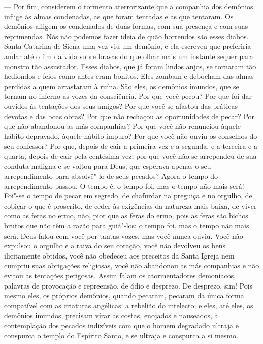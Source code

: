  --- Por fim, considerem o tormento aterrorizante que a companhia dos
demônios inflige às almas condenadas, as que foram tentadas e as que
tentaram. Os demônios afligem os condenados de duas formas, com sua
presença e com suas reprimendas. Nós não podemos fazer ideia de quão
horrendos são esses diabos. Santa Catarina de Siena uma vez viu um
demônio, e ela escreveu que preferiria andar até o fim da vida sobre
brasas do que olhar mais um instante sequer para monstro tão
assustador. Esses diabos, que já foram lindos anjos, se tornaram tão
hediondos e feios como antes eram bonitos. Eles zombam e debocham das
almas perdidas a quem arrastaram à ruína. São eles, os demônios
imundos, que se tornam no inferno as vozes da consciência. Por que você
pecou? Por que foi dar ouvidos às tentações dos seus amigos? Por que
você se afastou das práticas devotas e das boas obras? Por que não
rechaçou as oportunidades de pecar? Por que não abandonou as más
companhias? Por que você não renunciou àquele hábito depravado, àquele
hábito impuro? Por que você não ouviu os conselhos do seu confessor?
Por que, depois de cair a primeira vez e a segunda, e a terceira e a
quarta, depois de cair pela centésima vez, por que você não se
arrependeu de sua conduta maligna e se voltou para Deus, que esperava
apenas o seu arrependimento para absolvê"-lo de seus pecados? Agora
o tempo do arrependimento passou. O tempo é, o tempo foi, mas o tempo
não mais será! Foi"-se o tempo de pecar em segredo, de chafurdar na
preguiça e no orgulho, de cobiçar o que é proscrito, de ceder às
exigências da natureza mais baixa, de viver como as feras no ermo, não,
pior que as feras do ermo, pois as feras são bichos brutos que não têm
a razão para guiá"-los: o tempo foi, mas o tempo não mais será. Deus
falou com você por tantas vozes, mas você nunca ouviu. Você não
expulsou o orgulho e a raiva do seu coração, você não devolveu os bens
ilicitamente obtidos, você não obedeceu aos preceitos da Santa Igreja
nem cumpriu suas obrigações religiosas, você não abandonou as más
companhias e não evitou as tentações perigosas. Assim falam os
atormentadores demoníacos, palavras de provocação e repreensão, de ódio
e desprezo. De desprezo, sim! Pois mesmo eles, os próprios demônios,
quando pecaram, pecaram da única forma compatível com as criaturas
angélicas: a rebelião do intelecto; e eles, até eles, os demônios
imundos, precisam virar as costas, enojados e nauseados, à contemplação
dos pecados indizíveis com que o homem degradado ultraja e conspurca o
templo do Espírito Santo, e se ultraja e conspurca a si mesmo.

